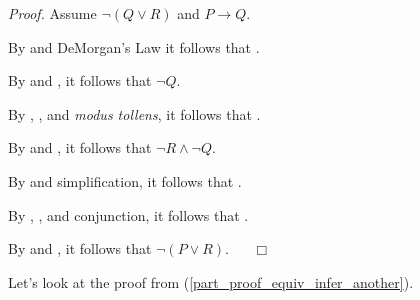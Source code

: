 \begin{act}
\begin{actpart}
            \emph{Proof.}
            Assume  $\neg(Q \lor R)$ and  $P \to Q$.
        
            By  and DeMorgan's Law it follows that  \underline{\hspace{.75 in}}.
        
            By  and \underline{\hspace{.75 in}}, it follows that  $\neg Q$.

            By , , and \emph{modus tollens}, it follows that  \underline{\hspace{.75 in}}.

            By  and \underline{\hspace{.75 in}}, it follows that  $\neg R \land \neg Q$.

            By  and simplification, it follows that  \underline{\hspace{.75 in}}.

            By , , and conjunction, it follows that  \underline{\hspace{.75 in}}.

            By  and \underline{\hspace{.75 in}}, it follows that $\neg(P \lor R)$. ~ \hfill ~$\Box$ 
    \end{actpart}
\end{act}

Let's look at the proof from  (\ref{part_proof_equiv_infer_another}).

